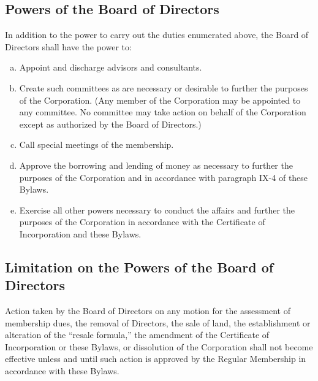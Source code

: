 \subsection{Powers of the Board of Directors}
In addition to the power to carry out the duties enumerated above, the
Board of Directors shall have the power to:
\begin{enumerate}[a.]
\item Appoint and discharge advisors and consultants.
\item Create such committees as are necessary or desirable to further
  the purposes of the Corporation. (Any member of the Corporation may
  be appointed to any committee. No committee may take action on
  behalf of the Corporation except as authorized by the Board of
  Directors.)
\item Call special meetings of the membership.
\item Approve the borrowing and lending of money as necessary to
  further the purposes of the Corporation and in accordance with
  paragraph IX-4 of these Bylaws.
\item Exercise all other powers necessary to conduct the affairs and
  further the purposes of the Corporation in accordance with the
  Certificate of Incorporation and these Bylaws.
\end{enumerate}


\subsection{Limitation on the Powers of the Board of Directors}
Action taken by the Board of Directors on any motion for the
assessment of membership dues, the removal of Directors, the sale of
land, the establishment or alteration of the “resale formula,” the
amendment of the Certificate of Incorporation or these Bylaws, or
dissolution of the Corporation shall not become effective unless and
until such action is approved by the Regular Membership in accordance
with these Bylaws.

